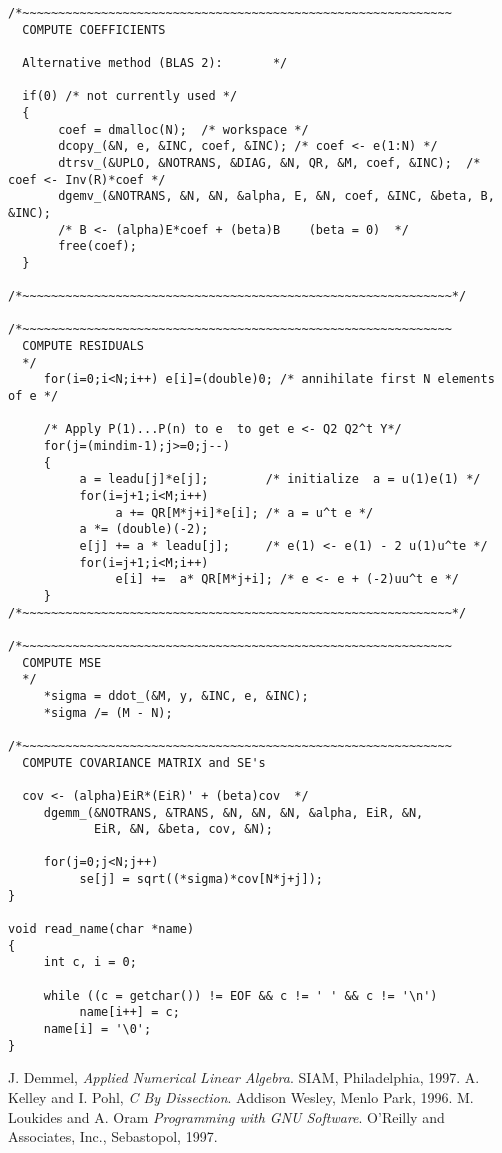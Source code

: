 \documentclass{article}
\begin{document}
\begin{verbatim}
/*~~~~~~~~~~~~~~~~~~~~~~~~~~~~~~~~~~~~~~~~~~~~~~~~~~~~~~~~~~~~
  COMPUTE COEFFICIENTS

  Alternative method (BLAS 2):       */

  if(0) /* not currently used */
  {
       coef = dmalloc(N);  /* workspace */
       dcopy_(&N, e, &INC, coef, &INC); /* coef <- e(1:N) */
       dtrsv_(&UPLO, &NOTRANS, &DIAG, &N, QR, &M, coef, &INC);  /* coef <- Inv(R)*coef */  
       dgemv_(&NOTRANS, &N, &N, &alpha, E, &N, coef, &INC, &beta, B, &INC);
       /* B <- (alpha)E*coef + (beta)B    (beta = 0)  */
       free(coef);
  }

/*~~~~~~~~~~~~~~~~~~~~~~~~~~~~~~~~~~~~~~~~~~~~~~~~~~~~~~~~~~~~*/
     
/*~~~~~~~~~~~~~~~~~~~~~~~~~~~~~~~~~~~~~~~~~~~~~~~~~~~~~~~~~~~~
  COMPUTE RESIDUALS
  */
     for(i=0;i<N;i++) e[i]=(double)0; /* annihilate first N elements of e */

     /* Apply P(1)...P(n) to e  to get e <- Q2 Q2^t Y*/
     for(j=(mindim-1);j>=0;j--)
     {
          a = leadu[j]*e[j];        /* initialize  a = u(1)e(1) */
          for(i=j+1;i<M;i++)
               a += QR[M*j+i]*e[i]; /* a = u^t e */
          a *= (double)(-2);
          e[j] += a * leadu[j];     /* e(1) <- e(1) - 2 u(1)u^te */
          for(i=j+1;i<M;i++)
               e[i] +=  a* QR[M*j+i]; /* e <- e + (-2)uu^t e */
     }
/*~~~~~~~~~~~~~~~~~~~~~~~~~~~~~~~~~~~~~~~~~~~~~~~~~~~~~~~~~~~~*/

/*~~~~~~~~~~~~~~~~~~~~~~~~~~~~~~~~~~~~~~~~~~~~~~~~~~~~~~~~~~~~
  COMPUTE MSE
  */
     *sigma = ddot_(&M, y, &INC, e, &INC);
     *sigma /= (M - N);

/*~~~~~~~~~~~~~~~~~~~~~~~~~~~~~~~~~~~~~~~~~~~~~~~~~~~~~~~~~~~~
  COMPUTE COVARIANCE MATRIX and SE's

  cov <- (alpha)EiR*(EiR)' + (beta)cov  */
     dgemm_(&NOTRANS, &TRANS, &N, &N, &N, &alpha, EiR, &N, 
            EiR, &N, &beta, cov, &N); 

     for(j=0;j<N;j++)
          se[j] = sqrt((*sigma)*cov[N*j+j]);
}

void read_name(char *name)
{
     int c, i = 0;
  
     while ((c = getchar()) != EOF && c != ' ' && c != '\n')
          name[i++] = c;
     name[i] = '\0';
}
\end{verbatim}

\pagebreak

\begin{thebibliography}{10}
 J. Demmel, {\sl Applied Numerical Linear Algebra}.
SIAM, Philadelphia, 1997.
 A. Kelley and I. Pohl, {\sl C By Dissection}.
Addison Wesley, Menlo Park, 1996.
 M. Loukides and A. Oram  {\sl Programming with GNU
Software}.  O'Reilly and Associates, Inc., Sebastopol, 1997.
\end{thebibliography}
\end{document}
